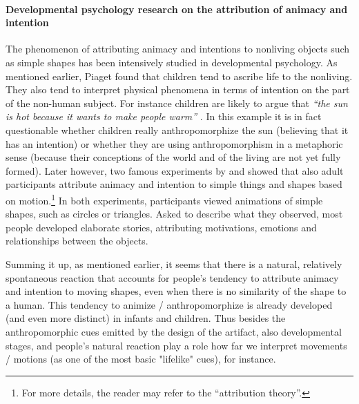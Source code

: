 \documentclass{frontiersSCNS} %
\begin{document}
\paragraph{Developmental psychology research on the attribution of animacy and intention\\}

The phenomenon of attributing animacy and intentions to nonliving objects such as simple shapes has been intensively studied in developmental psychology. As mentioned earlier, Piaget found that children tend to ascribe life to the nonliving. They also tend to interpret physical phenomena in terms of intention on the part of the non-human subject. For instance children are likely to argue that \textit{``the sun is hot because it wants to make people warm''} \citep{leeds_childrens_1992}. In this example it is in fact questionable whether children really anthropomorphize the sun (believing that it has an intention) or whether they are using anthropomorphism in a metaphoric sense (because their conceptions of the world and of the living are not yet fully formed). Later however, two famous experiments by \cite{heider_experimental_1944} and \cite{michotte_perception_1963} showed that also adult participants attribute animacy and intention to simple things and shapes based on motion.\footnote{For more details, the reader may refer to the ``attribution theory''.} In both experiments, participants viewed animations of simple shapes, such as circles or triangles. 
Asked to describe what they observed, most people developed elaborate stories, attributing motivations, emotions and relationships between the objects.


Summing it up, as mentioned earlier, it seems that there is a natural, relatively spontaneous reaction that accounts for people's tendency to attribute animacy and intention to moving shapes, even when there is no similarity of the shape to a human. This tendency to animize / anthropomorphize is already developed (and even more distinct) in infants and children. Thus besides the anthropomorphic cues emitted by the design of the artifact, also developmental stages, and people's natural reaction play a role how far we interpret movements / motions (as one of the most basic "lifelike" cues), for instance.
\end{document}
